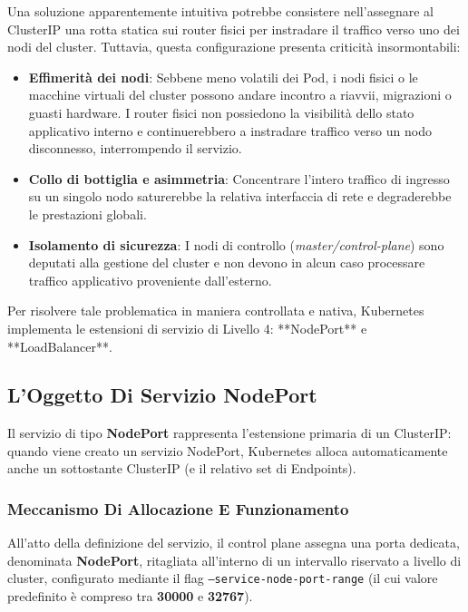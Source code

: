 \documentclass[11pt, a4paper]{article}
\begin{document}
Una soluzione apparentemente intuitiva potrebbe consistere nell'assegnare al ClusterIP una rotta statica sui router fisici per instradare il traffico verso uno dei nodi del cluster. Tuttavia, questa configurazione presenta criticità insormontabili:
\begin{itemize}[noitemsep]
    \item \textbf{Effimerità dei nodi}: Sebbene meno volatili dei Pod, i nodi fisici o le macchine virtuali del cluster possono andare incontro a riavvii, migrazioni o guasti hardware. I router fisici non possiedono la visibilità dello stato applicativo interno e continuerebbero a instradare traffico verso un nodo disconnesso, interrompendo il servizio.
    \item \textbf{Collo di bottiglia e asimmetria}: Concentrare l'intero traffico di ingresso su un singolo nodo saturerebbe la relativa interfaccia di rete e degraderebbe le prestazioni globali.
    \item \textbf{Isolamento di sicurezza}: I nodi di controllo (\emph{master/control-plane}) sono deputati alla gestione del cluster e non devono in alcun caso processare traffico applicativo proveniente dall'esterno.
\end{itemize}


Per risolvere tale problematica in maniera controllata e nativa, Kubernetes implementa le estensioni di servizio di Livello 4: **NodePort** e **LoadBalancer**.

\subsection{L'Oggetto Di Servizio NodePort}
Il servizio di tipo \textbf{NodePort} rappresenta l'estensione primaria di un ClusterIP: quando viene creato un servizio NodePort, Kubernetes alloca automaticamente anche un sottostante ClusterIP (e il relativo set di Endpoints).


\subsubsection{Meccanismo Di Allocazione E Funzionamento}
All'atto della definizione del servizio, il control plane assegna una porta dedicata, denominata \textbf{NodePort}, ritagliata all'interno di un intervallo riservato a livello di cluster, configurato mediante il flag \texttt{--service-node-port-range} (il cui valore predefinito è compreso tra \textbf{30000} e \textbf{32767}).
\end{document}

